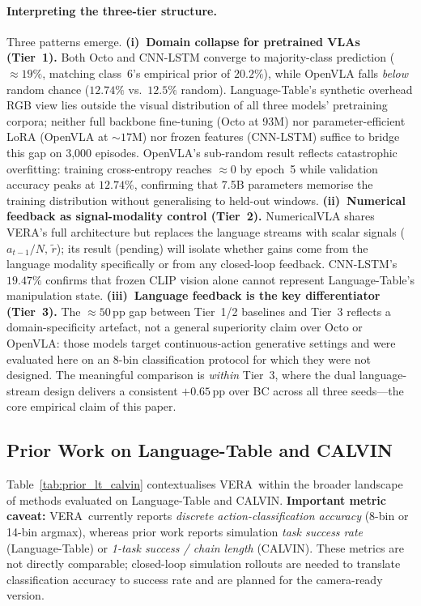 \documentclass{article}
\newcommand{\modelname}{\textsc{VERA}\xspace}
\begin{document}
\paragraph{Interpreting the three-tier structure.}
Three patterns emerge.
\textbf{(i)~Domain collapse for pretrained VLAs (Tier~1).}
Both Octo and CNN-LSTM converge to majority-class prediction (${\approx}19\%$,
matching class~6's empirical prior of $20.2\%$), while OpenVLA falls
\emph{below} random chance ($12.74\%$ vs.\ $12.5\%$ random).
Language-Table's synthetic overhead RGB view lies outside the visual
distribution of all three models' pretraining corpora;
neither full backbone fine-tuning (Octo at 93M) nor parameter-efficient LoRA
(OpenVLA at ${\sim}17$M) nor frozen features (CNN-LSTM) suffice to bridge
this gap on 3{,}000 episodes.
OpenVLA's sub-random result reflects catastrophic overfitting:
training cross-entropy reaches ${\approx}0$ by epoch~5
while validation accuracy peaks at $12.74\%$,
confirming that 7.5B parameters memorise the training distribution
without generalising to held-out windows.
\textbf{(ii)~Numerical feedback as signal-modality control (Tier~2).}
NumericalVLA shares \modelname's full architecture but replaces the language
streams with scalar signals ($a_{t-1}/N,\,\tilde{r}$); its result (pending)
will isolate whether gains come from the language modality specifically
or from any closed-loop feedback.
CNN-LSTM's $19.47\%$ confirms that frozen CLIP vision alone cannot
represent Language-Table's manipulation state.
\textbf{(iii)~Language feedback is the key differentiator (Tier~3).}
The ${\approx}50$\,pp gap between Tier~1/2 baselines and Tier~3 reflects a
domain-specificity artefact, not a general superiority claim over Octo or OpenVLA:
those models target continuous-action generative settings and were evaluated
here on an 8-bin classification protocol for which they were not designed.
The meaningful comparison is \emph{within} Tier~3, where the dual
language-stream design delivers a consistent $+0.65$\,pp over BC
across all three seeds---the core empirical claim of this paper.

\subsection{Prior Work on Language-Table and CALVIN}
\label{sec:prior_comparison}

Table~\ref{tab:prior_lt_calvin} contextualises \modelname\ within the broader
landscape of methods evaluated on Language-Table and CALVIN.
\textbf{Important metric caveat:} \modelname\ currently reports
\emph{discrete action-classification accuracy} (8-bin or 14-bin argmax),
whereas prior work reports simulation \emph{task success rate} (Language-Table)
or \emph{1-task success / chain length} (CALVIN).
These metrics are not directly comparable; closed-loop simulation rollouts
are needed to translate classification accuracy to success rate and are
planned for the camera-ready version.
\end{document}
